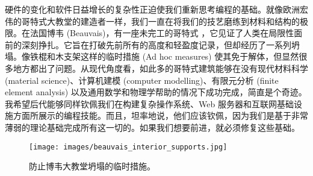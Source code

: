 硬件的变化和软件日益增长的复杂性正迫使我们重新思考编程的基础。就像欧洲宏伟的哥特式大教堂的建造者一样，我们一直在将我们的技艺磨练到材料和结构的极限。在法国博韦 (Beauvais)，有一座未完工的哥特式 ，它见证了人类在局限性面前的深刻挣扎。它旨在打破先前所有的高度和轻盈度记录，但却经历了一系列坍塌。像铁棍和木支架这样的临时措施 (Ad hoc measures) 使其免于解体，但显然很多地方都出了问题。从现代角度看，如此多的哥特式建筑能够在没有现代材料科学 (material science)、计算机建模 (computer modelling)、有限元分析 (finite element analysis) 以及通用数学和物理学帮助的情况下成功完成，简直是个奇迹。我希望后代能够同样钦佩我们在构建复杂操作系统、Web 服务器和互联网基础设施方面所展示的编程技能。而且，坦率地说，他们应该钦佩，因为我们是基于非常薄弱的理论基础完成所有这一切的。如果我们想要前进，就必须修复这些基础。

\begin{figure}
  \centering
  \texttt{[image: images/beauvais\_interior\_supports.jpg]}
  \caption{防止博韦大教堂坍塌的临时措施。}
\end{figure}
